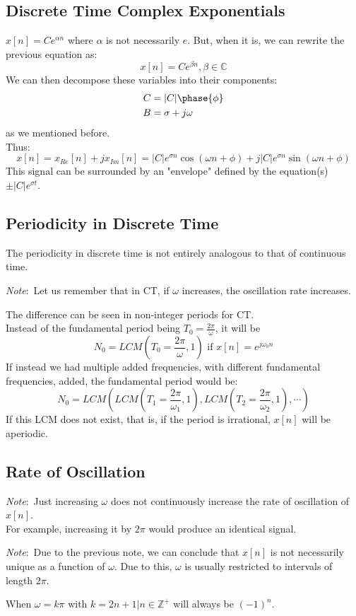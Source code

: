 \documentclass[nobib]{tufte-handout}
\newcommand{\note}[1]{
        \begin{notebox}
        \noindent\textit{Note}:\ #1
        \end{notebox}
}
\begin{document}
\subsection{Discrete Time Complex Exponentials}
$x[n] = Ce^{\alpha n}$ where $\alpha$ is not necessarily $e$.
But, when it is, we can rewrite the previous equation as:
\begin{equation*}
    x[n]=Ce^{\beta n}, \beta\in\mathbb{C}
\end{equation*}
We can then decompose these variables into their components:
\begin{align*}
    C & = |C|\phase{\phi}  \\
    B & = \sigma + j\omega
\end{align*}
as we mentioned before.\\
Thus:
\begin{equation*}
    x[n] = x_{Re}[n]+jx_{Im}[n] = |C|e^{\sigma n}\cos(\omega n+\phi)+j|C|e^{\sigma n}\sin(\omega n+\phi)
\end{equation*}
This signal can be surrounded by an "envelope" defined by the equation(s) $\pm |C|e^{\sigma t}$.
\subsection{Periodicity in Discrete Time}
The periodicity in discrete time is not entirely analogous to that of
continuous time. \note{Let us remember that in CT, if $\omega$ increases, the
    oscillation rate increases.} The difference can be seen in non-integer periods
for CT.\\ Instead of the fundamental period being $T_0=\frac{2\pi}{\omega}$, it
will be
\begin{equation*}
    N_0 = LCM(T_0=\frac{2\pi}{\omega},1) \text{ if } x[n] = e^{j\omega_0 n}
\end{equation*}
If instead we had multiple added frequencies, with different fundamental frequencies, added, the fundamental period would be:
\begin{equation*}
    N_0 = LCM(LCM(T_1=\frac{2\pi}{\omega_1},1), LCM(T_2=\frac{2\pi}{\omega_2},1), \cdots)
\end{equation*}
If this LCM does not exist, that is, if the period is irrational, $x[n]$ will be aperiodic.
\subsection{Rate of Oscillation}
\note{Just increasing $\omega$ does not continuously increase the rate of oscillation of $x[n]$. \\For example, increasing  it by $2\pi$ would produce an identical signal.}
\note{Due to the previous note, we can conclude that $x[n]$ is not necessarily unique as a function of $\omega$. Due to this, $\omega$ is usually restricted to intervals of length $2\pi$.}
When $\omega=k\pi$ with $k = 2n+1 | n\in\mathbb{Z}^+$ will always be $(-1)^n$.
\end{document}
